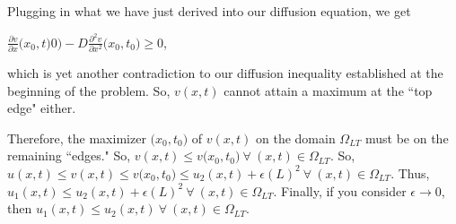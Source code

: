 \documentclass[executivepaper]{article}
\begin{document}
\begin{flushleft}
\begin{center}
\end{center}

\pagebreak

\vspace*{-40mm}

Plugging in what we have just derived into our diffusion equation, we get

\begin{center}

$\frac{\partial v}{\partial x}\Big(x_{0}, t){0}\Big)-D\frac{\partial^2 v}{\partial x^2}\Big(x_{0}, t_{0}\Big) \geq 0$,

\end{center}

which is yet another contradiction to our diffusion inequality established at the beginning of the problem. So, $v(x,t)$ cannot attain a maximum at the ``top edge" either.

\vspace{5mm}

Therefore, the maximizer $\Big(x_{0}, t_{0}\Big)$ of $v(x,t)$ on the domain $\Omega_{LT}$ must be on the remaining ``edges." So, $v(x,t) \leq v\Big(x_{0}, t_{0}\Big) {~} \forall {~} (x,t) \in \Omega_{LT}$. So, $u(x,t) \leq v(x,t) \leq v\Big(x_{0}, t_{0}\Big) \leq u_{2}(x,t)+\epsilon(L)^2 {~} \forall {~} (x,t) \in \Omega_{LT}$. Thus, $u_{1}(x,t) \leq u_{2}(x,t)+\epsilon(L)^2 {~} \forall {~} (x,t) \in \Omega_{LT}$. Finally, if you consider $\epsilon \rightarrow 0$, then $u_{1}(x,t) \leq u_{2}(x,t) {~} \forall {~} (x,t) \in \Omega_{LT}$.

\end{flushleft}
\end{document}
